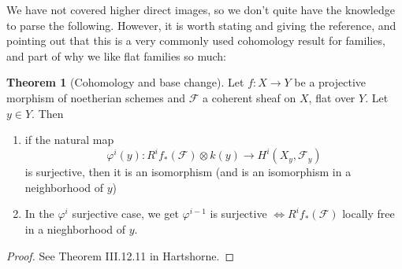 \documentclass[10pt,reqno]{amsart}
\theoremstyle{definition}
\newtheorem{theorem}{Theorem}
\theoremstyle{remark}
\numberwithin{equation}{section}
\numberwithin{theorem}{section}
\newcommand{\FF}{{\mathscr F}}
\begin{document}
We have not covered higher direct images, so we don't quite have the knowledge to parse the following. However, it is worth stating and giving the reference, and pointing out that this is a very commonly used cohomology result for families, and part of why we like flat families so much:

\begin{theorem}[Cohomology and base change] Let $f: X \to Y$ be a projective morphism of noetherian schemes and $\FF$ a coherent sheaf on $X$, flat over $Y$. Let $y \in Y$. Then
\begin{enumerate}
\item if the natural map 
\[\varphi^i(y): R^if_*(\FF) \otimes k(y) \to H^i(X_y,\FF_y)\]
is surjective, then it is an isomorphism (and is an isomorphism in a neighborhood of $y$)
\item In the $\varphi^i$ surjective case, we get $\varphi^{i-1}$ is surjective $\iff R^i f_*(\FF)$ locally free in a nieghborhood of $y$.
\end{enumerate}
\end{theorem}
\begin{proof} See Theorem III.12.11 in Hartshorne.
\end{proof}
\end{document}

